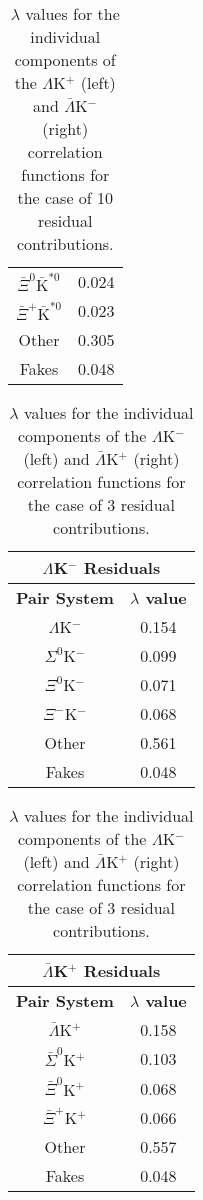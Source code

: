 \documentclass[ALICE,manyauthors]{cernphprep}
\begin{document}
\begin{table}[htbp]
\begin{minipage}{0.3\textwidth}
\begin{tabular}{|c|c|}
   $\bar{\Xi}^{0}\bar{\mathrm{K}}^{*0}$ & 0.024 \\
   $\bar{\Xi}^{+}\bar{\mathrm{K}}^{*0}$ & 0.023 \\
   Other & 0.305 \\
   Fakes & 0.048 \\
   \hline
  \end{tabular}
 \end{minipage} 
 \caption{$\lambda$ values for the individual components of the $\Lambda$K$^{+}$ (left) and $\bar{\Lambda}$K$^{-}$ (right) correlation functions for the case of 10 residual contributions.}
 \label{tab:LambdaValues_10Res_LamKchP}
\end{table}



\clearpage
\begin{table}[htbp]
 \centering
 \begin{minipage}{0.3\textwidth}
  \centering
  \begin{tabular}{|c|c|}
   \multicolumn{2}{c}{$\Lambda$K$^{-}$ Residuals} \\
   \hline
   \textbf{Pair System} & \textbf{$\lambda$ value} \\
   \hline
   $\Lambda$K$^{-}$ & 0.154 \\
   $\Sigma^{0}$K$^{-}$ & 0.099 \\
   $\Xi^{0}$K$^{-}$ & 0.071 \\
   $\Xi^{-}$K$^{-}$ & 0.068 \\
   Other & 0.561 \\
   Fakes & 0.048 \\
   \hline
  \end{tabular}
 \end{minipage}
 \begin{minipage}{0.3\textwidth}
  \centering
  \begin{tabular}{|c|c|}
   \multicolumn{2}{c}{$\bar{\Lambda}$K$^{+}$ Residuals} \\
   \hline
   \textbf{Pair System} & \textbf{$\lambda$ value} \\
   \hline
   $\bar{\Lambda}$K$^{+}$ & 0.158 \\
   $\bar{\Sigma}^{0}$K$^{+}$ & 0.103 \\
   $\bar{\Xi}^{0}$K$^{+}$ & 0.068 \\
   $\bar{\Xi}^{+}$K$^{+}$ & 0.066 \\
   Other & 0.557 \\
   Fakes & 0.048 \\
   \hline
  \end{tabular}
 \end{minipage} 
 \caption{$\lambda$ values for the individual components of the $\Lambda$K$^{-}$ (left) and $\bar{\Lambda}$K$^{+}$ (right) correlation functions for the case of 3 residual contributions.}
 \label{tab:LambdaValues_3Res_LamKchM}
\end{table}
\end{document}
